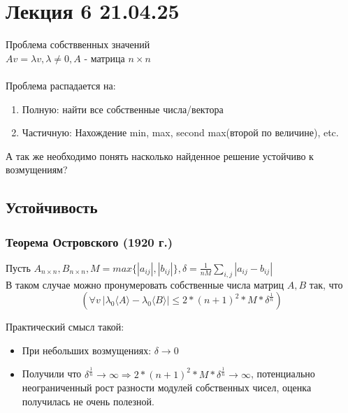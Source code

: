 \section{Лекция 6 21.04.25}
Проблема собстввенных значений
\\
\(Av = \lambda v, \lambda \ne 0, A\) - матрица \({n \times n}\)
\\
\\
Проблема распадается на:
\begin{enumerate}
    \item Полную: найти все собственные числа/вектора 
    \item Частичную: Нахождение min, max, second max(второй по величине), etc.
\end{enumerate}
А так же необходимо понять насколько найденное решение устойчиво к возмущениям?
\newline

\subsection{Устойчивость}
\subsubsection{Теорема Островского (1920 г.)}  
Пусть \(A_{n \times n}, B_{n \times n}, M = max\{ |a_{ij}|, |b_{ij}|\}, \delta = \frac{1}{nM}\sum_{i,j}|a_{ij} - b_{ij}|\) \\
В таком случае можно пронумеровать собственные числа матриц \(A, B\) так, что \[ (\forall v\ |\lambda_0\langle A \rangle - \lambda_0\langle B \rangle| \leq 2 * (n+1)^2 *M * \delta^{\frac{1}{n}} ) \]

Практический смысл такой: 
\begin{itemize}
    \item При небольших возмущениях: \(\delta \rightarrow 0\)  
    \item Получили что $\delta^{\frac{1}{n}} \rightarrow \infty \Rightarrow 2 * (n+1)^2 *M * \delta^{\frac{1}{n}} \rightarrow \infty $, потенциально неограниченный рост разности модулей собственных чисел, оценка получилась не очень полезной.

\end{itemize}


